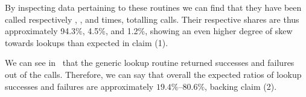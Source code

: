 By inspecting data pertaining to these routines we can find that they have been called respectively , , and  times, totalling  calls.
Their respective shares are thus approximately 94.3\%, 4.5\%, and 1.2\%, showing an even higher degree of skew towards lookups than expected in claim (1).

We can see in~\cite{dict-metrics} that the generic lookup routine returned  successes and  failures out of the  calls.
Therefore, we can say that overall the expected ratios of lookup successes and failures are approximately ${19.4}\%$--${80.6}\%$, backing claim (2).
